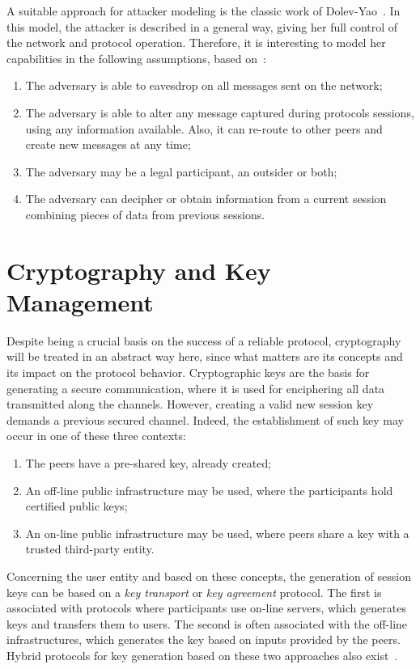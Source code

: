A suitable approach for attacker modeling is the classic work of Dolev-Yao~\cite{DolevYao81}. In this model, the attacker is described in a general way, giving her full control of the network and protocol operation. Therefore, it is interesting to model her capabilities in the following assumptions, based on~\cite{BoydMathuria2008}:

\begin{enumerate}
  \item The adversary is able to eavesdrop on all messages sent on the network;
  \item The adversary is able to alter any message captured during protocols sessions, using any information available. Also, it can re-route to other peers and create new messages at any time;
  \item The adversary may be a legal participant, an outsider or both;
  \item The adversary can decipher or obtain information from a current session combining pieces of data from previous sessions.
\end{enumerate}





\section{Cryptography and Key Management}
Despite being a crucial basis on the success of a reliable protocol, cryptography will be treated in an abstract way here, since what matters are its concepts and its impact on the protocol behavior. Cryptographic keys are the basis for generating a secure communication, where it is used for enciphering all data transmitted along the channels. However, creating a valid new session key demands a previous secured channel. Indeed, the establishment of such key may occur in one of these three contexts:

\begin{enumerate}
  \item The peers have a pre-shared key, already created;
  \item An off-line public infrastructure may be used, where the participants hold certified public keys;
  \item An on-line public infrastructure may be used, where peers share a key with a trusted third-party entity.
\end{enumerate}

Concerning the user entity and based on these concepts, the generation of session keys can be based on a \textit{key transport} or \textit{key agreement} protocol. The first is associated with protocols where participants use on-line servers, which generates keys and transfers them to users. The second is often associated with the off-line infrastructures, which generates the key based on inputs provided by the peers. Hybrid protocols for key generation based on these two approaches also exist~\cite{BoydMathuria2008}.





